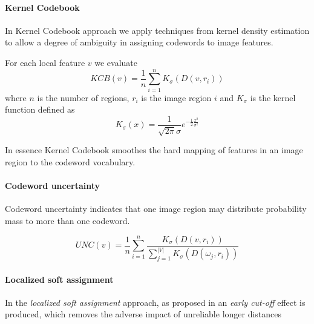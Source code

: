 \paragraph{Kernel Codebook}

In Kernel Codebook approach we apply techniques from kernel density estimation to allow a degree of ambiguity in assigning codewords to image features. 

For each local feature $v$ we evaluate
$$KCB(v) = \frac{1}{n} \sum_{i = 1}^{n} K_{\sigma}(D(v, r_i))$$
where $n$ is the number of regions, $r_i$ is the image region $i$ and $K_{\sigma}$ is the kernel function defined as
$$K_{\sigma} (x) = \frac{1}{\sqrt{2\pi} \sigma} e^{- \frac{1}{2} \frac{x^2}{\sigma^2}}$$

In essence Kernel Codebook smoothes the hard mapping of features in an image region to the codeword vocabulary.

\paragraph{Codeword uncertainty}

Codeword uncertainty indicates that one image region may distribute probability mass to more than one codeword.

$$UNC(v) = \frac{1}{n} \sum_{i = 1}^{n} \frac{K_{\sigma}(D(v, r_i))}{\sum_{j=1}^{|V|} K_{\sigma}(D(\omega_j, r_i))}$$

\paragraph{Localized soft assignment}

In the \emph{localized soft assignment} approach, as proposed in an \emph{early cut-off} effect is produced, which removes the adverse impact of unreliable longer distances
